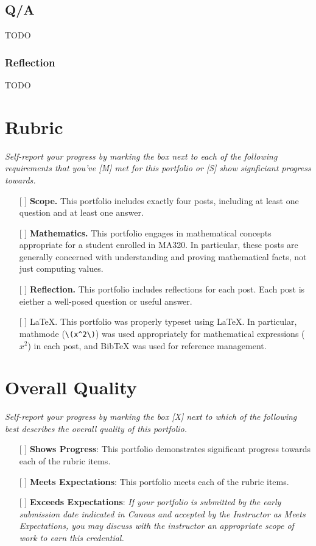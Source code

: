 \documentclass{article}
\begin{document}
\subsection{Q/A}
TODO \cite{1089984}

\subsubsection*{Reflection}
TODO





\section{Rubric}
\textit{Self-report your progress by marking the box next to
each of the following requirements that you've [M] met
for this portfolio or [S] show signficiant progress towards.}

\begin{itemize}
\item[[ ]] \textbf{Scope.} This portfolio includes exactly
four posts, including at least one question and at least one
answer.
\item[[ ]] \textbf{Mathematics.} This portfolio engages in
mathematical concepts appropriate for a student enrolled in
MA320. In particular, these posts are generally concerned
with understanding and proving mathematical facts, not just
computing values.
\item[[ ]] \textbf{Reflection.} This portfolio includes
reflections for each post. Each post
is eiether a well-posed question or useful answer.
\item[[ ]] \LaTeX{}. This portfolio was properly typeset
using \LaTeX{}. In particular, mathmode (\verb|\(x^2\)|) was
used appropriately for mathematical expressions (\(x^2\))
in each post, and BibTeX \cite{bibtexDocs}
was used for reference management.
\end{itemize}


\section{Overall Quality}
\textit{Self-report your progress by marking the box [X] next to
which of the following best describes the overall quality of
this portfolio.}

\begin{itemize}
\item[[ ]] \textbf{Shows Progress}: This portfolio demonstrates
significant progress towards each of the rubric items.

\item[[ ]] \textbf{Meets Expectations}: This portfolio meets
each of the rubric items.

\item[[ ]] \textbf{Exceeds Expectations}: \textit{If your
portfolio is submitted by the early submission date indicated in Canvas
and accepted by the Instructor as Meets Expectations,
you may discuss with the instructor an appropriate scope of
work to earn this credential.}

\end{itemize}




\end{document}
